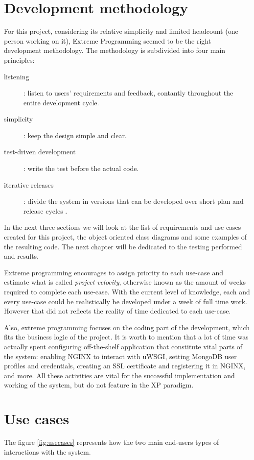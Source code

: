 \section{Development methodology}
For this project, considering its relative simplicity and limited headcount
(one person working on it), Extreme Programming seemed to be the right
development methodology. The methodology is subdivided into four main
principles:
\begin{description}
\item[listening]: listen to users' requirements and feedback, contantly
throughout the entire development cycle.
\item[simplicity]: keep the design simple and clear.
\item[test-driven development]: write the test before the actual code.
\item[iterative releases]: divide the system in versions that can be developed
over short plan and release cycles \cite{RP05}.
\end{description} 
In the next three sections we will look at the list of requirements and use
cases created for this project, the object oriented class diagrams and some
examples of the resulting code. The next chapter will be dedicated to the
testing performed and results.

Extreme programming encourages to assign priority to each use-case
and estimate what is called \emph{project velocity}, otherwise known as the
amount of weeks required to complete each use-case. With the current level of
knowledge, each and every use-case could be realistically be developed under a
week of full time work. However that did not reflects the reality of time
dedicated to each use-case.

Also, extreme programming focuses on the coding part of the development, which
fits the business logic of the project. It is worth to mention that a lot of
time was actually spent configuring off-the-shelf application that constitute
vital parts of the system: enabling NGINX to interact with uWSGI, setting
MongoDB user profiles and credentials, creating an SSL certificate and
registering it in NGINX, and more. All these activities are vital for the
successful implementation and working of the system, but do not feature in the
XP paradigm.


\section{Use cases}
The figure \ref{fig:usecases} represents how the two main end-users types of 
interactions with the system.

